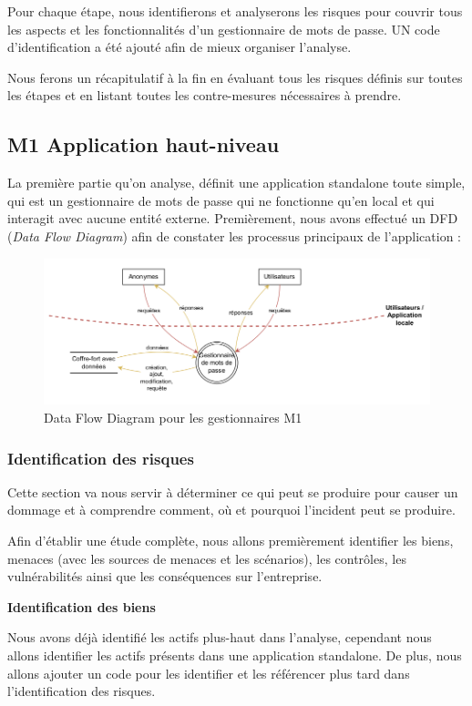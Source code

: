 Pour chaque étape, nous identifierons et analyserons les risques pour couvrir tous les aspects et les fonctionnalités d'un gestionnaire de mots de passe. UN code d'identification a été ajouté afin de mieux organiser l'analyse.

Nous ferons un récapitulatif à la fin en évaluant tous les risques définis sur toutes les étapes et en listant toutes les contre-mesures nécessaires à prendre.
\newpage

\subsection{M1 Application haut-niveau}

La première partie qu'on analyse, définit une application standalone toute simple, qui est un gestionnaire de mots de passe qui ne fonctionne qu'en local et qui interagit avec aucune entité externe. Premièrement, nous avons effectué un DFD (\textit{Data Flow Diagram}) afin de constater les processus principaux de l'application :

\begin{figure}[H]
	\includegraphics[width=13cm]{images/dfd_local.png}
	\centering
	\caption{Data Flow Diagram pour les gestionnaires M1}
\end{figure}

\subsubsection{Identification des risques}
Cette section va nous servir à déterminer ce qui peut se produire pour causer un dommage et à comprendre comment, où et pourquoi l'incident peut se produire. 

Afin d'établir une étude complète, nous allons premièrement identifier les biens, menaces (avec les sources de menaces et les scénarios), les contrôles, les vulnérabilités ainsi que les conséquences sur l'entreprise.

\textbf{Identification des biens}

Nous avons déjà identifié les actifs plus-haut dans l'analyse, cependant nous allons identifier les actifs présents dans une application standalone. De plus, nous allons ajouter un code pour les identifier et les référencer plus tard dans l'identification des risques.

